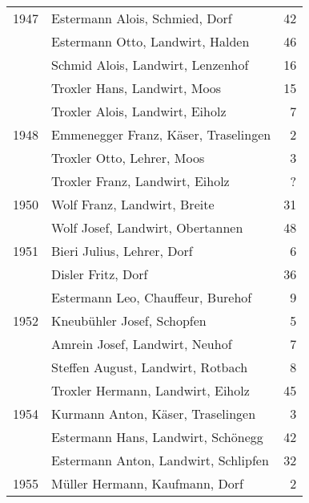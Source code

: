 {\begin{longtable}{ l l r }
        \\
        1947          & Estermann Alois, Schmied, Dorf            & 42          \\
                      & Estermann Otto, Landwirt, Halden          & 46          \\
                      & Schmid Alois, Landwirt, Lenzenhof         & 16          \\
                      & Troxler Hans, Landwirt, Moos              & 15          \\
                      & Troxler Alois, Landwirt, Eiholz           & 7           \\
        1948          & Emmenegger Franz, Käser, Traselingen      & 2           \\
                      & Troxler Otto, Lehrer, Moos                & 3           \\
                      & Troxler Franz, Landwirt, Eiholz           & ?           \\
        1950          & Wolf Franz, Landwirt, Breite              & 31          \\
                      & Wolf Josef, Landwirt, Obertannen          & 48          \\
        1951          & Bieri Julius, Lehrer, Dorf                & 6           \\
                      & Disler Fritz, Dorf                        & 36          \\
                      & Estermann Leo, Chauffeur, Burehof         & 9           \\
        1952          & Kneubühler Josef, Schopfen                & 5           \\
                      & Amrein Josef, Landwirt, Neuhof            & 7           \\
                      & Steffen August, Landwirt, Rotbach         & 8           \\
                      & Troxler Hermann, Landwirt, Eiholz         & 45          \\
        1954          & Kurmann Anton, Käser, Traselingen         & 3           \\
                      & Estermann Hans, Landwirt, Schönegg        & 42          \\
                      & Estermann Anton, Landwirt, Schlipfen      & 32          \\
        1955          & Müller Hermann, Kaufmann, Dorf            & 2           \\

\end{longtable}}
